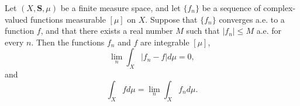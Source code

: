 Let $(X, \mathbf{S}, \mu)$ be a finite measure space, and let $\{f_n\}$ be a sequence of complex-valued functions measurable $[\mu]$ on $X$. Suppose that $\{f_n\}$ converges a.e. to a function $f$, and that there exists a real number $M$ such that $|f_n| \leq M$ a.e. for every $n$. Then the functions $f_n$ and $f$ are integrable $[\mu]$,
$$\lim_n \int_X |f_n - f| d\mu = 0,$$
and
$$\int_X f d\mu = \lim_n \int_X f_n d\mu.$$

